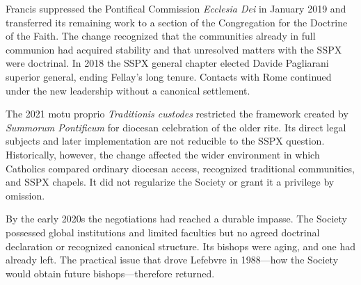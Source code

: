 Francis suppressed the Pontifical Commission \emph{Ecclesia Dei} in January 2019 and transferred its remaining work to a section of the Congregation for the Doctrine of the Faith. The change recognized that the communities already in full communion had acquired stability and that unresolved matters with the SSPX were doctrinal. In 2018 the SSPX general chapter elected Davide Pagliarani superior general, ending Fellay's long tenure. Contacts with Rome continued under the new leadership without a canonical settlement.

The 2021 motu proprio \emph{Traditionis custodes} restricted the framework created by \emph{Summorum Pontificum} for diocesan celebration of the older rite. Its direct legal subjects and later implementation are not reducible to the SSPX question. Historically, however, the change affected the wider environment in which Catholics compared ordinary diocesan access, recognized traditional communities, and SSPX chapels. It did not regularize the Society or grant it a privilege by omission.

By the early 2020s the negotiations had reached a durable impasse. The Society possessed global institutions and limited faculties but no agreed doctrinal declaration or recognized canonical structure. Its bishops were aging, and one had already left. The practical issue that drove Lefebvre in 1988---how the Society would obtain future bishops---therefore returned.
